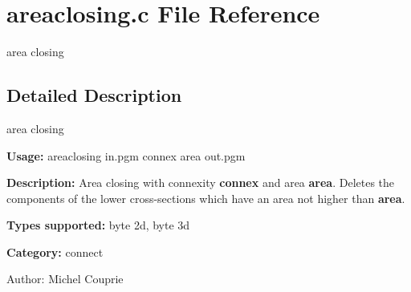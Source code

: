 \section{areaclosing.c File Reference}
\label{areaclosing_8c}
area closing 



\subsection{Detailed Description}
area closing 

{\bf Usage:} areaclosing in.pgm connex area out.pgm

{\bf Description:} Area closing with connexity {\bf connex} and area {\bf area}. Deletes the components of the lower cross-sections which have an area not higher than {\bf area}.

{\bf Types supported:} byte 2d, byte 3d

{\bf Category:} connect

\begin{Desc}
\item[Author:]Michel Couprie \end{Desc}
